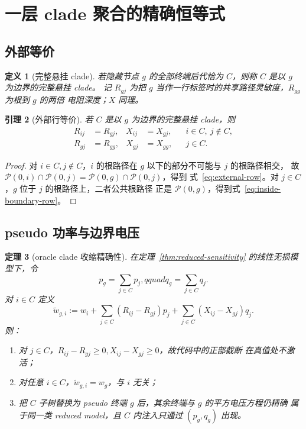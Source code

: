 \documentclass[UTF8,11pt]{ctexart}
\newtheorem{definition}{定义}[section]
\newtheorem{theorem}[definition]{定理}
\newtheorem{lemma}[definition]{引理}
\newcommand{\pathset}{\mathcal P}
\begin{document}
\section{一层 clade 聚合的精确恒等式}

\subsection{外部等价}

\begin{definition}[完整悬挂 clade]
若隐藏节点 $g$ 的全部终端后代恰为 $C$，则称 $C$ 是以 $g$ 为边界的完整悬挂 clade。
记 $R_{gj}$ 为把 $g$ 当作一行标签时的共享路径灵敏度，$R_{gg}$ 为根到 $g$ 的两倍
电阻深度；$X$ 同理。
\end{definition}

\begin{lemma}[外部行等价]
\label{lem:external-equivalence}
若 $C$ 是以 $g$ 为边界的完整悬挂 clade，则
\begin{align}
 R_{ij}&=R_{gj},&X_{ij}&=X_{gj},&& i\in C,\ j\notin C,\label{eq:external-row}\\
 R_{gj}&=R_{gg},&X_{gj}&=X_{gg},&&j\in C.\label{eq:inside-boundary-row}
\end{align}
\end{lemma}

\begin{proof}
对 $i\in C,j\notin C$，$i$ 的根路径在 $g$ 以下的部分不可能与 $j$ 的根路径相交，
故 $\pathset(0,i)\cap\pathset(0,j)=\pathset(0,g)\cap\pathset(0,j)$，得到
式~\eqref{eq:external-row}。对 $j\in C$，$g$ 位于 $j$ 的根路径上，二者公共根路径
正是 $\pathset(0,g)$，得到式~\eqref{eq:inside-boundary-row}。
\end{proof}

\subsection{pseudo 功率与边界电压}

\begin{theorem}[oracle clade 收缩精确性]
\label{thm:oracle-aggregation}
在定理~\ref{thm:reduced-sensitivity} 的线性无损模型下，令
\begin{equation}
 p_g=\sum_{j\in C}p_j,qquad q_g=\sum_{j\in C}q_j.
 \label{eq:pseudo-injection}
\end{equation}
对 $i\in C$ 定义
\begin{equation}
 \widetilde w_{g,i}
 :=w_i+\sum_{j\in C}(R_{ij}-R_{gj})p_j
 +\sum_{j\in C}(X_{ij}-X_{gj})q_j.
 \label{eq:oracle-deembedding}
\end{equation}
则：
\begin{enumerate}[label=\textup{(\alph*)}]
\item 对 $j\in C$，$R_{ij}-R_{gj}\ge0,X_{ij}-X_{gj}\ge0$，故代码中的正部截断
在真值处不激活；
\item 对任意 $i\in C$，$\widetilde w_{g,i}=w_g$，与 $i$ 无关；
\item 把 $C$ 子树替换为 pseudo 终端 $g$ 后，其余终端与 $g$ 的平方电压方程仍精确
属于同一类 reduced model，且 $C$ 内注入只通过 $(p_g,q_g)$ 出现。
\end{enumerate}
\end{theorem}
\end{document}
